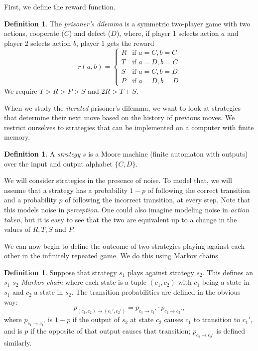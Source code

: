 \documentclass[11pt]{amsart}
\theoremstyle{definition}
\newtheorem{definition}[theorem]{Definition}
\theoremstyle{remark}
\begin{document}
First, we define the reward function.

\begin{definition}
  The \textit{prisoner's dilemma} is a symmetric two-player game with two actions, cooperate ($C$) and defect ($D$), where, if player 1 selects action $a$ and player 2 selects action $b$, player 1 gets the reward
  \begin{equation*}
    r(a,b) = \begin{cases}
      R &\text{if $a = C, b = C$} \\
      T &\text{if $a = D, b = C$} \\
      S &\text{if $a = C, b = D$} \\
      P &\text{if $a = D, b = D$}
    \end{cases}
  \end{equation*}
  We require $T > R > P > S$ and $2R > T + S$.
\end{definition}

When we study the \textit{iterated} prisoner's dilemma, we want to look at strategies that determine their next move based on the history of previous moves. We restrict ourselves to strategies that can be implemented on a computer with finite memory.

\begin{definition}
  A \textit{strategy} $s$ is a Moore machine (finite automaton with outputs) over the input and output alphabet $\{C, D\}$. 
\end{definition}

We will consider strategies in the presence of noise. To model that, we will assume that a strategy has a probability $1-p$ of following the correct transition and a probability $p$ of following the incorrect transition, at every step. Note that this models noise in \textit{perception}. One could also imagine modeling noise in \textit{action taken}, but it is easy to see that the two are equivalent up to a change in the values of $R, T, S$ and $P$.

We can now begin to define the outcome of two strategies playing against each other in the infinitely repeated game. We do this using Markov chains.

\begin{definition}
  Suppose that strategy $s_1$ plays against strategy $s_2$. This defines an \textit{$s_1$-$s_2$ Markov chain} where each state is a tuple $(c_1,c_2)$ with $c_1$ being a state in $s_1$ and $c_2$ a state in $s_2$. The transition probabilities are defined in the obvious way:
  \begin{equation*}
    p_{(c_1,c_2) \to (c_1', c_2')} = p_{c_1 \to c_1'} \cdot p_{c_2 \to c_2'},
  \end{equation*}
  where $p_{c_1 \to c_1'}$ is $1-p$ if the output of $s_2$ at state $c_2$ causes $c_1$ to transition to $c_1'$, and is $p$ if the opposite of that output causes that transition; $p_{c_2 \to c_2'}$ is defined similarly.
\end{definition}
\end{document}
